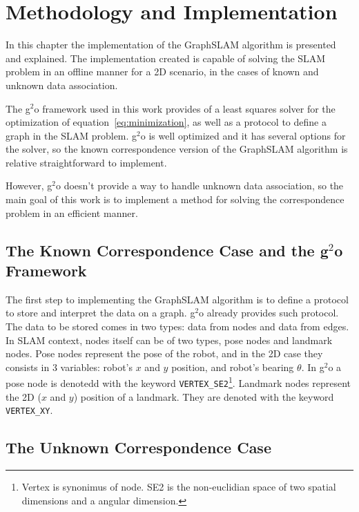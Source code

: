 \chapter{Methodology and Implementation}
\label{chap:implementation}
 
In this chapter the implementation of the GraphSLAM algorithm is presented and explained. The implementation created is capable of solving the SLAM problem in an offline manner for a 2D scenario, in the cases of known and unknown data association.

The g$^2$o framework used in this work provides of a least squares solver for the optimization of equation~\eqref{eq:minimization}, as well as a protocol to define a graph in the SLAM problem. g$^2$o is well optimized and it has several options for the solver, so the known correspondence version of the GraphSLAM algorithm is relative straightforward to implement.

However, g$^2$o doesn't provide a way to handle unknown data association, so the main goal of this work is to implement a method for solving the correspondence problem in an efficient manner.

\section{The Known Correspondence Case and the g$^2$o Framework}

The first step to implementing the GraphSLAM algorithm is to define a protocol to store and interpret the data on a graph. g$^2$o already provides such protocol. The data to be stored comes in two types: data from nodes and data from edges. In SLAM context, nodes itself can be of two types, pose nodes and landmark nodes. Pose nodes represent the pose of the robot, and in the 2D case they consists in 3 variables: robot's $x$ and $y$ position, and robot's bearing $\theta$. In g$^2$o a pose node is denotedd with the keyword \texttt{VERTEX_SE2}\footnote{Vertex is synonimus of node. SE2 is the non-euclidian space of two spatial dimensions and a angular dimension.}. Landmark nodes represent the 2D ($x$ and $y$) position of a landmark. They are denoted with the keyword \texttt{VERTEX_XY}.




\section{The Unknown Correspondence Case}
